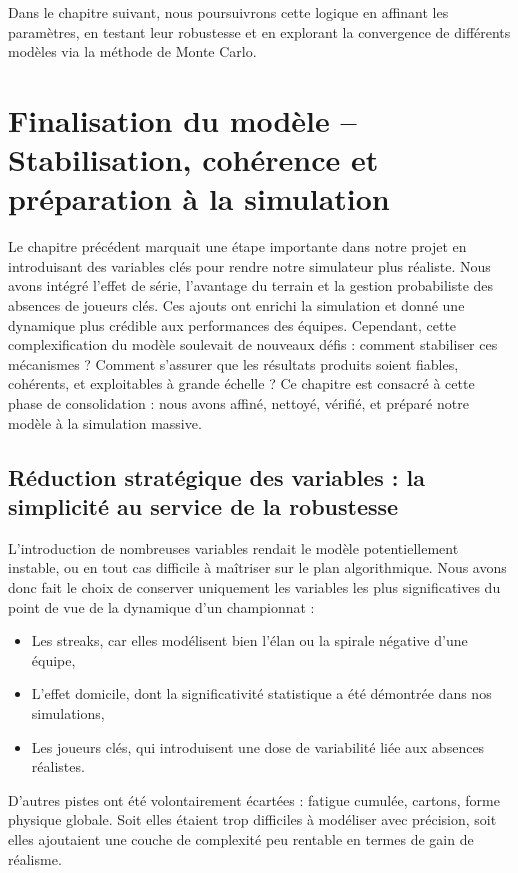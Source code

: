 \documentclass[12pt]{report}
\begin{document}
Dans le chapitre suivant, nous poursuivrons cette logique en affinant les paramètres, en testant leur robustesse et en explorant la convergence de différents modèles via la méthode de Monte Carlo.

\chapter{Finalisation du modèle – Stabilisation, cohérence et préparation à la simulation}

Le chapitre précédent marquait une étape importante dans notre projet en introduisant des variables clés pour rendre notre simulateur plus réaliste. Nous avons intégré l’effet de série, l’avantage du terrain et la gestion probabiliste des absences de joueurs clés. Ces ajouts ont enrichi la simulation et donné une dynamique plus crédible aux performances des équipes. Cependant, cette complexification du modèle soulevait de nouveaux défis : comment stabiliser ces mécanismes ? Comment s’assurer que les résultats produits soient fiables, cohérents, et exploitables à grande échelle ? Ce chapitre est consacré à cette phase de consolidation : nous avons affiné, nettoyé, vérifié, et préparé notre modèle à la simulation massive.

\section{Réduction stratégique des variables : la simplicité au service de la robustesse}

L’introduction de nombreuses variables rendait le modèle potentiellement instable, ou en tout cas difficile à maîtriser sur le plan algorithmique. Nous avons donc fait le choix de conserver uniquement les variables les plus significatives du point de vue de la dynamique d’un championnat :\\
\begin{itemize}
  \item Les streaks, car elles modélisent bien l’élan ou la spirale négative d’une équipe,
  \item L’effet domicile, dont la significativité statistique a été démontrée dans nos simulations,
  \item Les joueurs clés, qui introduisent une dose de variabilité liée aux absences réalistes.\\
\end{itemize}

D’autres pistes ont été volontairement écartées : fatigue cumulée, cartons, forme physique globale. Soit elles étaient trop difficiles à modéliser avec précision, soit elles ajoutaient une couche de complexité peu rentable en termes de gain de réalisme.
\end{document}
